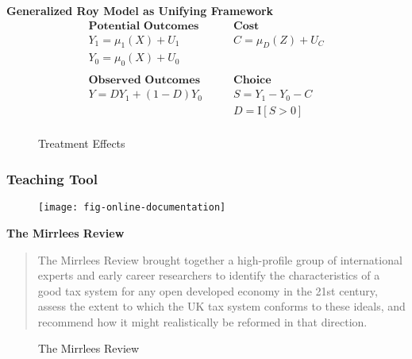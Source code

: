 \begin{frame}
	\textbf{Generalized Roy Model as Unifying Framework}
	\begin{align*}
	\textbf{Potential Outcomes} &\qquad \textbf{Cost} \\
	Y_1 = \mu_1(X) + U_1      &\qquad C = \mu_D(Z) + U_C \\
	Y_0 = \mu_0(X) + U_0      &\qquad \\
	& \\
	\textbf{Observed Outcomes} &\qquad \textbf{Choice} \\
	Y = D Y_1 + (1 - D)Y_0 &\qquad S = Y_1 - Y_0 - C \\
	&\qquad D = \mathrm{I}[S > 0] \\
	\end{align*}
\end{frame}
\begin{frame}
	\begin{figure}[htp]\centering
		\caption{Treatment Effects}
	\end{figure}
\end{frame}
\begin{frame}
	\frametitle{Teaching Tool}
	\begin{figure}[htp]\centering
		\texttt{[image: fig-online-documentation]}
	\end{figure}
\end{frame}
\begin{frame}
	\textbf{The Mirrlees Review} \\ \vspace{15pt}
	\begin{quote}
		The Mirrlees Review brought together a high-profile group of
		international experts and early career researchers to identify the
		characteristics of a good tax system for any open developed economy in
		the 21st century, assess the extent to which the UK tax system conforms
		to these ideals, and recommend how it might realistically be reformed in
		that direction.
	\end{quote}
\end{frame}
\begin{frame}
	\begin{figure}
		\caption{The Mirrlees Review}
		\centering
		 \hspace{25pt}
	\end{figure} 
\end{frame}